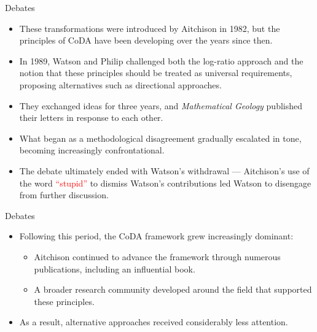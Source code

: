 \begin{frame}{Debates}
\begin{itemize}
  \item[\textcolor{blue}{\large$\blacktriangleright$}] These transformations were introduced by Aitchison in 1982, but the principles of CoDA have been developing over the years since then.
  \item[\textcolor{blue}{\large$\blacktriangleright$}] In 1989, Watson and Philip challenged both the log-ratio approach and the notion that these principles should be treated as universal requirements, proposing alternatives such as directional approaches.
  \item[\textcolor{blue}{\large$\blacktriangleright$}] They exchanged ideas for three years, and \textit{Mathematical Geology} published their letters in response to each other.
  \item[\textcolor{blue}{\large$\blacktriangleright$}] What began as a methodological disagreement gradually escalated in tone, becoming increasingly confrontational.
  \item[\textcolor{blue}{\large$\blacktriangleright$}] The debate ultimately ended with Watson's withdrawal --- Aitchison's use of the word \textcolor{red}{``stupid''} to dismiss Watson's contributions led Watson to disengage from further discussion.
\end{itemize}
\end{frame}

\begin{frame}{Debates}
\begin{itemize}
  \item[1.] Following this period, the CoDA framework grew increasingly dominant:
  \begin{itemize}
    \item[1.1] Aitchison continued to advance the framework through numerous publications, including an influential book.
    \item[1.2] A broader research community developed around the field that supported these principles.
  \end{itemize}
  \item[2.] As a result, alternative approaches received considerably less attention.
\end{itemize}
\end{frame}

